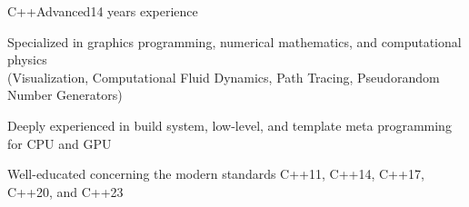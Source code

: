 \documentclass[a4paper,10pt]{cv}
\begin{document}
        \begin{cvLongSkillItem}{C++}{Advanced}{14 years experience}%
          \vspace{-15pt}
          \begin{cvItemize}
            \item Specialized in graphics programming, numerical mathematics, and computational physics \\
            (Visualization, Computational Fluid Dynamics, Path Tracing, Pseudorandom Number Generators)
            \item Deeply experienced in build system, low-level, and template meta programming for CPU and GPU
            \item Well-educated concerning the modern standards C++11, C++14, C++17, C++20, and C++23
          \end{cvItemize}

\end{cvLongSkillItem}
\end{document}

